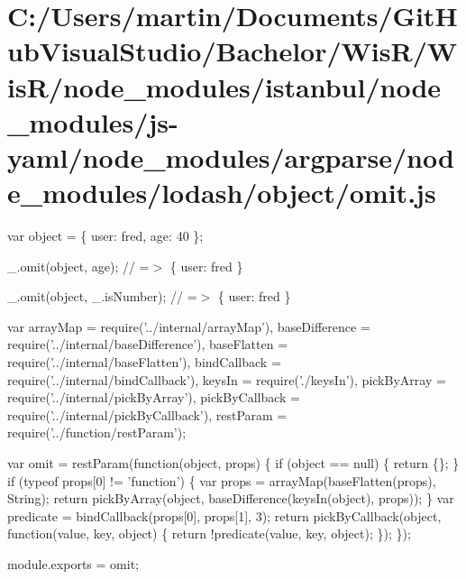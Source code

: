 \hypertarget{_c_1_2_users_2martin_2_documents_2_git_hub_visual_studio_2_bachelor_2_wis_r_2_wis_r_2node_module09dbedaf10fc72ef0c90db9fb033e421}{}\section{C\+:/\+Users/martin/\+Documents/\+Git\+Hub\+Visual\+Studio/\+Bachelor/\+Wis\+R/\+Wis\+R/node\+\_\+modules/istanbul/node\+\_\+modules/js-\/yaml/node\+\_\+modules/argparse/node\+\_\+modules/lodash/object/omit.\+js}
var object = \{ \textquotesingle{}user\textquotesingle{}\+: \textquotesingle{}fred\textquotesingle{}, \textquotesingle{}age\textquotesingle{}\+: 40 \};

\+\_\+.\+omit(object, \textquotesingle{}age\textquotesingle{}); // =$>$ \{ \textquotesingle{}user\textquotesingle{}\+: \textquotesingle{}fred\textquotesingle{} \}

\+\_\+.\+omit(object, \+\_\+.\+is\+Number); // =$>$ \{ \textquotesingle{}user\textquotesingle{}\+: \textquotesingle{}fred\textquotesingle{} \}


\begin{DoxyCodeInclude}
var arrayMap = require(\textcolor{stringliteral}{'../internal/arrayMap'}),
    baseDifference = require(\textcolor{stringliteral}{'../internal/baseDifference'}),
    baseFlatten = require(\textcolor{stringliteral}{'../internal/baseFlatten'}),
    bindCallback = require(\textcolor{stringliteral}{'../internal/bindCallback'}),
    keysIn = require(\textcolor{stringliteral}{'./keysIn'}),
    pickByArray = require(\textcolor{stringliteral}{'../internal/pickByArray'}),
    pickByCallback = require(\textcolor{stringliteral}{'../internal/pickByCallback'}),
    restParam = require(\textcolor{stringliteral}{'../function/restParam'});

var omit = restParam(\textcolor{keyword}{function}(\textcolor{keywordtype}{object}, props) \{
  \textcolor{keywordflow}{if} (\textcolor{keywordtype}{object} == null) \{
    \textcolor{keywordflow}{return} \{\};
  \}
  \textcolor{keywordflow}{if} (typeof props[0] != \textcolor{stringliteral}{'function'}) \{
    var props = arrayMap(baseFlatten(props), String);
    \textcolor{keywordflow}{return} pickByArray(\textcolor{keywordtype}{object}, baseDifference(keysIn(\textcolor{keywordtype}{object}), props));
  \}
  var predicate = bindCallback(props[0], props[1], 3);
  \textcolor{keywordflow}{return} pickByCallback(\textcolor{keywordtype}{object}, \textcolor{keyword}{function}(value, key, \textcolor{keywordtype}{object}) \{
    \textcolor{keywordflow}{return} !predicate(value, key, \textcolor{keywordtype}{object});
  \});
\});

module.exports = omit;
\end{DoxyCodeInclude}
 